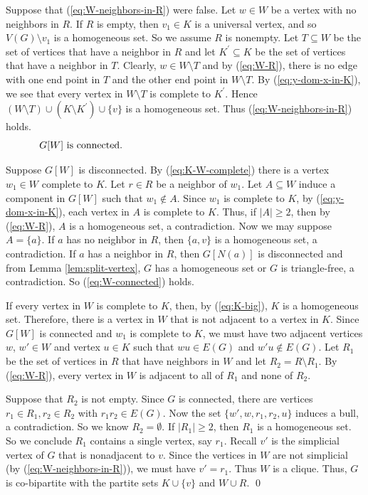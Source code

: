 \documentclass[a4paper,11pt]{article}
\theoremstyle{case}
\begin{document}
Suppose that (\ref{eq:W-neighbors-in-R}) were false. Let $w \in W$ be a vertex with no neighbors in $R$. If $R$ is empty, then $v_1\in K$ is a universal vertex, and so $V(G) \setminus v_1$ is a homogeneous set. So we assume $R$ is nonempty. Let $T\subseteq W$ be the set of vertices that have a neighbor in $R$ and let $K^{'}\subseteq K$ be the set of vertices that have a neighbor in $T$. Clearly, $w \in W\setminus T$ and by (\ref{eq:W-R}), there is no edge with one end point in $T$ and the other end point in $W\setminus T$. By (\ref{eq:y-dom-x-in-K}), we see that every vertex in $W\setminus T$ is complete to $K^{'}$. Hence $(W\setminus T)\cup (K\setminus K^{'}) \cup \{v\}$ is a homogeneous set. Thus (\ref{eq:W-neighbors-in-R}) holds.
%
\begin{equation}\label{eq:W-connected}
	\text{\parbox{.85\textwidth}{
     $G[W]$ is connected. 
    }}
\end{equation}

Suppose $G[W]$ is disconnected. By  (\ref{eq:K-W-complete}) there is a vertex $w_1 \in W$ complete to $K$. Let $r \in R$ be a neighbor of $w_1$. Let $A\subseteq W$ induce a component in $G[W]$ such that $w_1 \notin A$. Since $w_1$ is complete to $K$, by (\ref{eq:y-dom-x-in-K}), each vertex in $A$ is complete to $K$. Thus, if $|A|\ge 2$, then by (\ref{eq:W-R}), $A$ is a homogeneous set, a contradiction. Now we may suppose $A = \{a\}$. If $a$ has no neighbor in $R$, then $\{a, v\}$ is a homogeneous set, a contradiction. If $a$ has a neighbor in $R$, then $G[N(a)]$ is disconnected and from Lemma \ref{lem:split-vertex}, $G$ has a homogeneous set or $G$ is triangle-free, a contradiction. So (\ref{eq:W-connected}) holds. 

If every vertex in $W$ is complete to $K$, then, by (\ref{eq:K-big}), $K$ is a homogeneous set. Therefore, there is a vertex in $W$ that is not adjacent to a vertex in $K$. Since $G[W]$ is connected and $w_1$ is complete to $K$, we must have two adjacent vertices $w$, $w' \in W$ and vertex $u \in K$ such that $wu \in E(G)$ and $w'u \notin E(G)$. Let $R_1$ be the set of vertices in $R$ that have neighbors in $W$ and let $R_2 = R \setminus R_1$. By (\ref{eq:W-R}), every vertex in $W$ is adjacent to all of $R_1$ and none of $R_2$. 

Suppose that $R_2$ is not empty. Since $G$ is connected, there are vertices $r_1 \in R_1, r_2 \in R_2$ with $r_1 r_2 \in E(G)$. Now the set $\{  w', w, r_1, r_2,  u\}$ induces a bull, a contradiction. So we know $R_2 = \emptyset$. If $|R_1| \geq 2$, then $R_1$ is a homogeneous set. So we conclude $R_1$ contains a single vertex, say $r_1$. Recall $v'$ is the simplicial vertex of $G$ that is nonadjacent to $v$. Since the vertices in $W$ are not simplicial (by (\ref{eq:W-neighbors-in-R})), we must have $v' = r_1$. Thus $W$ is a clique. Thus, $G$ is co-bipartite with the partite sets $K \cup \{v\}$ and $W \cup R$. \qed 
\end{document}
